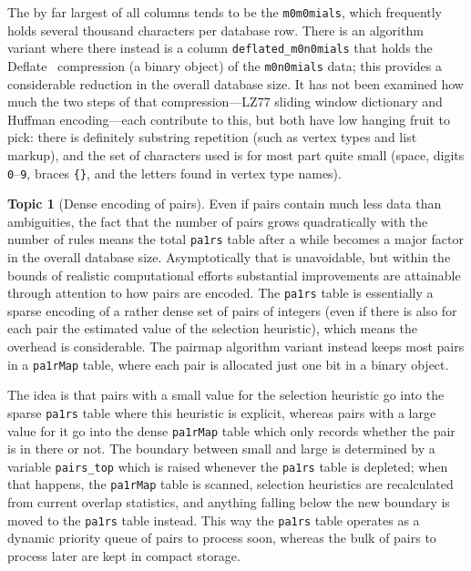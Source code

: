\documentclass{article}
\theoremstyle{definition}
\newtheorem{topic}{Topic}
\begin{document}
The by far largest of all columns tends to be the 
\texttt{m0m0mials}, which frequently holds several thousand 
characters per database row. There is an algorithm variant where 
there instead is a column \verb|deflated_m0n0mials| that holds the 
Deflate~\cite{deflate} compression (a binary object) of the 
\texttt{m0n0mials} data; this provides a considerable reduction in 
the overall database size. It has not been examined how much the two 
steps of that compression---LZ77 sliding window dictionary and 
Huffman encoding---each contribute to this, but both have low hanging 
fruit to pick: there is definitely substring repetition (such as 
vertex types and list markup), and the set of characters used is for 
most part quite small (space, digits \texttt{0}--\texttt{9}, braces 
\verb|{}|, and the letters found in vertex type names).

\begin{topic}[Dense encoding of pairs]
  Even if pairs contain much less data than ambiguities, the fact 
  that the number of pairs grows quadratically with the number of 
  rules means the total \texttt{pa1rs} table after a while becomes 
  a major factor in the overall database size. Asymptotically that is 
  unavoidable, but within the bounds of realistic computational 
  efforts substantial improvements are attainable through attention 
  to how pairs are encoded. The \texttt{pa1rs} table is essentially a 
  sparse encoding of a rather dense set of pairs of integers (even if 
  there is also for each pair the estimated value of the selection 
  heuristic), which means the overhead is considerable. The 
  \textsf{pairmap} algorithm variant instead keeps most pairs in a 
  \texttt{pa1rMap} table, where each pair is allocated just one bit 
  in a binary object.
  
  The idea is that pairs with a small value for the selection 
  heuristic go into the sparse \texttt{pa1rs} table where this 
  heuristic is explicit, whereas pairs with a large value for it go 
  into the dense \texttt{pa1rMap} table which only records whether 
  the pair is in there or not. The boundary between small and large 
  is determined by a variable \verb|pairs_top| which is raised 
  whenever the \texttt{pa1rs} table is depleted; when that happens, 
  the \texttt{pa1rMap} table is scanned, selection heuristics are 
  recalculated from current overlap statistics, and anything falling 
  below the new boundary is moved to the \texttt{pa1rs} table 
  instead. This way the \texttt{pa1rs} table operates as a dynamic 
  priority queue of pairs to process soon, whereas the bulk of pairs 
  to process later are kept in compact storage.
\end{topic}
\end{document}
